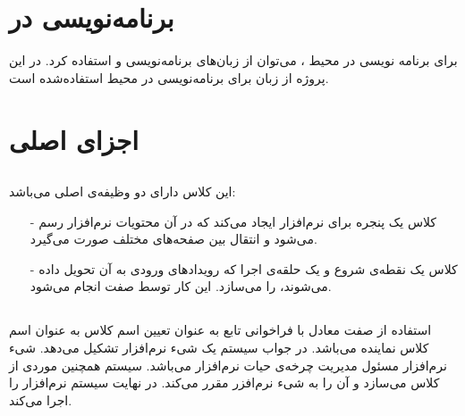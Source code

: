 \documentclass[oneside]{report}
\begin{document}
    \cite{ibeaconoverview}
	
\section{برنامه‌نویسی در {\normalsize {}}}
	برای برنامه نویسی در محیط 
	{\normalsize {}}
	، می‌توان از زبان‌های برنامه‌نویسی
	{\normalsize {}}
	و 
	{\normalsize {}}
	استفاده کرد. در این پروژه از زبان 
	{\normalsize {}}
	برای برنامه‌نویسی در محیط 
	{\normalsize {}}
	استفاده‌شده است. 
\section{ اجزای اصلی}
	\subsection{{\small {}}}
این کلاس دارای دو وظیفه‌ی اصلی می‌باشد: 
\begin{itemize}
	\item[-]
	کلاس 
	{\normalsize {}}
	یک پنجره برای نرم‌افزار ایجاد می‌کند که در آن محتویات نرم‌افزار رسم می‌شود و انتقال بین صفحه‌های مختلف صورت می‌گیرد.
	\item[-]
	کلاس 
	{\normalsize {}}
	یک نقطه‌ی شروع 
	و یک حلقه‌ی اجرا 
	که رویداد‌های ورودی 
	به ‌آن تحویل داده می‌شوند، را می‌سازد.  این کار توسط صفت 
	{\normalsize {}}	
	انجام می‌شود.
\end{itemize}
	
\subsection{	{\small {}}	}
استفاده از صفت 
	{\normalsize {}}	
	معادل با فراخوانی تابع 
		{\normalsize {}}		
		به عنوان تعیین اسم کلاس
			{\normalsize {}}	
			به عنوان اسم کلاس نماینده 
			می‌باشد.  در جواب سیستم یک شی‌ء نرم‌افزار
			 تشکیل می‌دهد. شیء نرم‌افزار مسئول مدیریت چرخه‌ی حیات 
	نرم‌افزار می‌باشد. سیستم همچنین موردی از کلاس
			{\normalsize {}}	
می‌سازد و آن‌ را به شیء نرم‌افزر مقرر می‌کند. در نهایت سیستم نرم‌افزار را اجرا می‌کند. 
\end{document}
